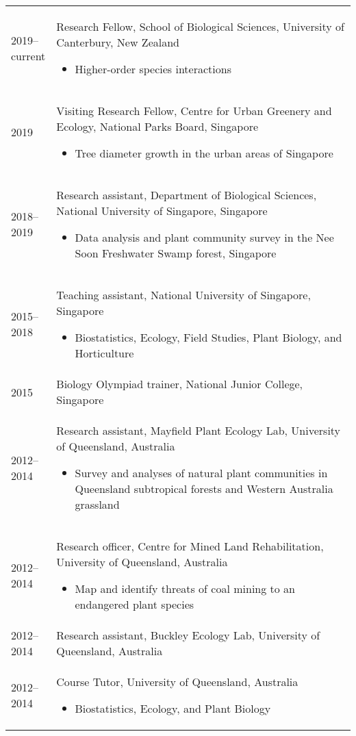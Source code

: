 \documentclass[a4paper]{article}
\begin{document}
\begin{tabular}{p{0.13\linewidth} p{0.87\linewidth}}

2019--current & Research Fellow, School of Biological Sciences, University of Canterbury, New Zealand
\begin{itemize} 
\item Higher-order species interactions
\end{itemize} \\

2019 & Visiting Research Fellow, Centre for Urban Greenery and Ecology, National Parks Board, Singapore
\begin{itemize} 
\item Tree diameter growth in the urban areas of Singapore
\end{itemize} \\

2018--2019 & Research assistant, Department of Biological Sciences, National University of Singapore, Singapore
\begin{itemize} 
\item Data analysis and plant community survey in the Nee Soon Freshwater Swamp forest, Singapore
\end{itemize} \\

2015--2018 & Teaching assistant, National University of Singapore, Singapore
\begin{itemize} 
\item Biostatistics, Ecology, Field Studies, Plant Biology, and Horticulture
\end{itemize} \\

2015 & Biology Olympiad trainer, National Junior College, Singapore \\

2012--2014 & Research assistant, Mayfield Plant Ecology Lab, University of Queensland, Australia 
\begin{itemize}
\item Survey and analyses of natural plant communities in Queensland subtropical forests and Western Australia grassland 
\end{itemize} \\

2012--2014 & Research officer, Centre for Mined Land Rehabilitation, University of Queensland, Australia
\begin{itemize} 
\item Map and identify threats of coal mining to an endangered plant species
\end{itemize} \\

2012--2014 & Research assistant, Buckley Ecology Lab, University of Queensland, Australia \\

2012--2014 & Course Tutor, University of Queensland, Australia
\begin{itemize} 
\item Biostatistics, Ecology, and Plant Biology
\end{itemize} \\

\end{tabular}
\end{document}
